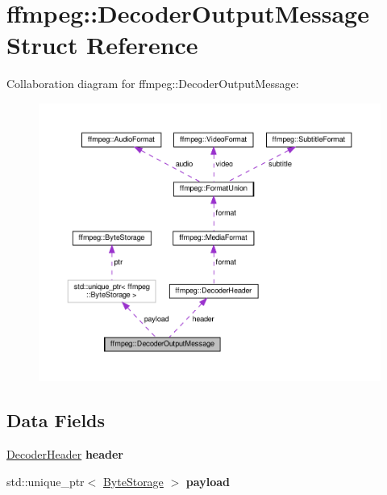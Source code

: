 \hypertarget{structffmpeg_1_1DecoderOutputMessage}{}\section{ffmpeg\+:\+:Decoder\+Output\+Message Struct Reference}
\label{structffmpeg_1_1DecoderOutputMessage}


Collaboration diagram for ffmpeg\+:\+:Decoder\+Output\+Message\+:
\nopagebreak
\begin{figure}[H]
\begin{center}
\leavevmode
\includegraphics[width=350pt]{structffmpeg_1_1DecoderOutputMessage__coll__graph}
\end{center}
\end{figure}
\subsection*{Data Fields}
\begin{DoxyCompactItemize}
\item 
\mbox{\label{structffmpeg_1_1DecoderOutputMessage_a4d124e8dbca4bda3c760ffee2d2e9279}} 
\hyperlink{structffmpeg_1_1DecoderHeader}{Decoder\+Header} {\bfseries header}
\item 
\mbox{\label{structffmpeg_1_1DecoderOutputMessage_a1ba0176210db236e3a695e1273a5465b}} 
std\+::unique\+\_\+ptr$<$ \hyperlink{classffmpeg_1_1ByteStorage}{Byte\+Storage} $>$ {\bfseries payload}
\end{DoxyCompactItemize}


